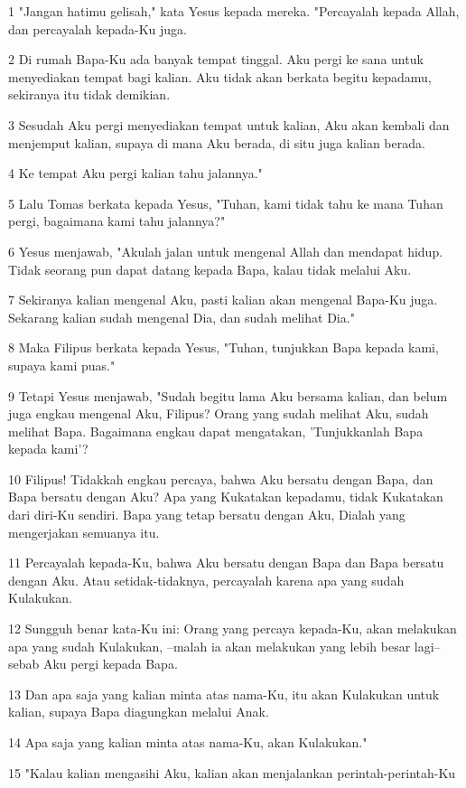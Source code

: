\par 1 "Jangan hatimu gelisah," kata Yesus kepada mereka. "Percayalah kepada Allah, dan percayalah kepada-Ku juga.
\par 2 Di rumah Bapa-Ku ada banyak tempat tinggal. Aku pergi ke sana untuk menyediakan tempat bagi kalian. Aku tidak akan berkata begitu kepadamu, sekiranya itu tidak demikian.
\par 3 Sesudah Aku pergi menyediakan tempat untuk kalian, Aku akan kembali dan menjemput kalian, supaya di mana Aku berada, di situ juga kalian berada.
\par 4 Ke tempat Aku pergi kalian tahu jalannya."
\par 5 Lalu Tomas berkata kepada Yesus, "Tuhan, kami tidak tahu ke mana Tuhan pergi, bagaimana kami tahu jalannya?"
\par 6 Yesus menjawab, "Akulah jalan untuk mengenal Allah dan mendapat hidup. Tidak seorang pun dapat datang kepada Bapa, kalau tidak melalui Aku.
\par 7 Sekiranya kalian mengenal Aku, pasti kalian akan mengenal Bapa-Ku juga. Sekarang kalian sudah mengenal Dia, dan sudah melihat Dia."
\par 8 Maka Filipus berkata kepada Yesus, "Tuhan, tunjukkan Bapa kepada kami, supaya kami puas."
\par 9 Tetapi Yesus menjawab, "Sudah begitu lama Aku bersama kalian, dan belum juga engkau mengenal Aku, Filipus? Orang yang sudah melihat Aku, sudah melihat Bapa. Bagaimana engkau dapat mengatakan, 'Tunjukkanlah Bapa kepada kami'?
\par 10 Filipus! Tidakkah engkau percaya, bahwa Aku bersatu dengan Bapa, dan Bapa bersatu dengan Aku? Apa yang Kukatakan kepadamu, tidak Kukatakan dari diri-Ku sendiri. Bapa yang tetap bersatu dengan Aku, Dialah yang mengerjakan semuanya itu.
\par 11 Percayalah kepada-Ku, bahwa Aku bersatu dengan Bapa dan Bapa bersatu dengan Aku. Atau setidak-tidaknya, percayalah karena apa yang sudah Kulakukan.
\par 12 Sungguh benar kata-Ku ini: Orang yang percaya kepada-Ku, akan melakukan apa yang sudah Kulakukan, --malah ia akan melakukan yang lebih besar lagi--sebab Aku pergi kepada Bapa.
\par 13 Dan apa saja yang kalian minta atas nama-Ku, itu akan Kulakukan untuk kalian, supaya Bapa diagungkan melalui Anak.
\par 14 Apa saja yang kalian minta atas nama-Ku, akan Kulakukan."
\par 15 "Kalau kalian mengasihi Aku, kalian akan menjalankan perintah-perintah-Ku
